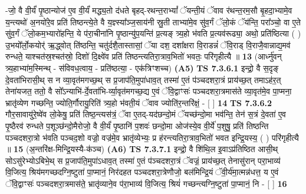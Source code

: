 \documentclass[17pt]{extarticle}
\begin{document}
                  -जो॒ वै वी॒र्यं॑ पृ॒ष्ठान्योज॑ ए॒व वी॒र्यं॑ मद्ध्य॒तो द॑धते बृहद्-रथन्त॒राभ्यां᳚ ॅयन्ती॒यं ॅवाव र॑थन्त॒रम॒सौ बृ॒हदा॒भ्यामे॒व य॒न्त्यथो॑ अ॒नयो॑रे॒व प्रति॑ तिष्ठन्त्ये॒ते वै य॒ज्ञ्स्या᳚ञ्ज॒साय॑नी स्रु॒ती ताभ्या॑मे॒व सु॑व॒र्गं ॅलो॒कं ॅय॑न्ति॒ परा᳚ञ्चो॒ वा ए॒ते सु॑व॒र्गं ॅलो॒कम॒भ्यारो॑हन्ति॒ ये प॑रा॒चीना॑नि पृ॒ष्ठान्यु॑प॒यन्ति॑ प्र॒त्यङ् त्र्य॒हो भ॑वति प्र॒त्यव॑रूढ्या॒ अथो॒ प्रति॑ष्ठित्या ( ) उ॒भयो᳚र्लो॒कयोर्॑ ऋ॒द्ध्वोत् ति॑ष्ठन्ति॒ चतु॑र्दशै॒तास्तासां॒ ॅया दश॒ दशा᳚क्षरा वि॒राडन्नं॑ ॅवि॒राड् वि॒राजै॒वान्नाद्य॒मव॑ रुन्धते॒ याश्चत॑स्र॒श्चत॑स्रो॒ दिशो॑ दि॒क्ष्वे॑व प्रति॑ तिष्ठन्त्यतिरा॒त्राव॒भितो॑ भवतः॒ परि॑गृहीत्यै ॥ \textbf{  13} \newline
                  \newline
                      (आर्ध्नु॑वन् त्र्य॒हाभ्या॑म॒स्मिन्थ् - स॑विवध॒त्वाय॒ - प्रति॑ष्ठत्या॒ - एक॑त्रिꣳशच्च)  \textbf{(A5)} \newline \newline
                                        \textbf{ TS 7.3.6.1} \newline
                  इन्द्रो॒ वै स॒दृङ् दे॒वता॑भिरासी॒थ् स न व्या॒वृत॑मगच्छ॒थ् स प्र॒जाप॑ति॒मुपा॑धाव॒त् तस्मा॑ ए॒तं प॑ञ्चदशरा॒त्रं प्राय॑च्छ॒त् तमाऽह॑र॒त् तेना॑यजत॒ ततो॒ वै सो᳚ऽन्याभि॑-र्दे॒वता॑भि-र्व्या॒वृत॑मगच्छ॒द्य ए॒वं ॅवि॒द्वाꣳसः॑ पञ्चदशरा॒त्रमास॑ते व्या॒वृत॑मे॒व पा॒प्मना॒ भ्रातृ॑व्येण गच्छन्ति॒ ज्योति॒र्गौरायु॒रिति॑ त्र्य॒हो भ॑वती॒यं ॅवाव ज्योति॑र॒न्तरि॑क्षं॒ - [  ] \textbf{  14} \newline
                  \newline
                                \textbf{ TS 7.3.6.2} \newline
                  गौर॒सावायु॑रे॒ष्वे॑व लो॒केषु॒ प्रति॑ तिष्ठ॒न्त्यस॑त्रं॒ ॅवा ए॒तद्-यद॑छन्दो॒मं ॅयच्छ॑न्दो॒मा भव॑न्ति॒ तेन॑ स॒त्रं दे॒वता॑ ए॒व पृ॒ष्ठैरव॑ रुन्धते प॒शूञ्छ॑न्दो॒मैरोजो॒ वै वी॒र्यं॑ पृ॒ष्ठानि॑ प॒शवः॑ छन्दो॒मा ओज॑स्ये॒व वी॒र्ये॑ प॒शुषु॒ प्रति॑ तिष्ठन्ति पञ्चदशरा॒त्रो भ॑वति पञ्चद॒शो वज्रो॒ वज्र॑मे॒व भ्रातृ॑व्येभ्यः॒ प्र ह॑रन्त्यतिरा॒त्राव॒भितो॑ भवत इन्द्रि॒यस्य॒ ( ) परि॑गृहीत्यै ॥ \textbf{  15 } \newline
                  \newline
                      (अ॒न्तरि॑क्ष-मिन्द्रि॒यस्यै-क॑ञ्च)  \textbf{(A6)} \newline \newline
                                        \textbf{ TS 7.3.7.1} \newline
                  इन्द्रो॒ वै शि॑थि॒ल इ॒वाऽप्र॑तिष्ठित आसी॒थ् सोऽसु॑रेभ्योऽबिभे॒थ् स प्र॒जाप॑ति॒मुपा॑ऽधाव॒त् तस्मा॑ ए॒तं प॑ञ्चदशरा॒त्रं ॅवज्रं॒ प्राय॑च्छ॒त् तेनासु॑रान् परा॒भाव्य॑ वि॒जित्य॒ श्रिय॑मगच्छदग्नि॒ष्टुता॑ पा॒प्मानं॒ निर॑दहत पञ्चदशरा॒त्रेणौजो॒ बल॑मिन्द्रि॒यं ॅवी॒र्य॑मा॒त्मन्न॑धत्त॒ य ए॒वं ॅवि॒द्वाꣳसः॑ पञ्चदशरा॒त्रमास॑ते॒ भ्रातृ॑व्याने॒व प॑रा॒भाव्य॑ वि॒जित्य॒ श्रियं॑ गच्छन्त्यग्नि॒ष्टुता॑ पा॒प्मानं॒ नि - [  ] \textbf{  16} \newline
\end{document}

